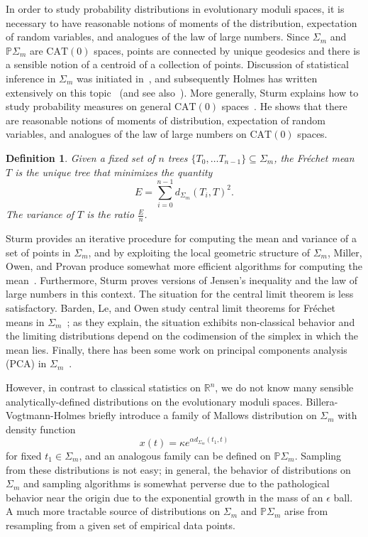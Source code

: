 \documentclass[a4paper,11pt]{article}
\newtheorem{definition}[theorem]{Definition}
\newcommand{\CAT}{\textrm{CAT}}
\begin{document}
In order to study probability distributions in evolutionary moduli spaces, it is necessary to have reasonable notions of moments of the distribution, expectation of random variables, and analogues of the law of large numbers.
Since $\Sigma_m$ and $\mathbb{P}\Sigma_m$ are $\CAT(0)$ spaces, points are connected by unique geodesics and there is a sensible notion of a centroid of a collection of points.
Discussion of statistical inference in $\Sigma_m$ was initiated in~\cite{billera2001geometry}, and subsequently Holmes has written extensively on this topic~\cite{holmes2003bootstrapping, holmes2003bootstrapping, holmes2005statistical} (and see also~\cite{feragen2013tree}).
More generally, Sturm explains how to study probability measures on general $\CAT(0)$ spaces~\cite{sturm2003probability}.
He shows that there are reasonable notions of moments of distribution, expectation of random variables, and analogues of the law of large numbers on $\CAT(0)$ spaces.

\begin{definition}
Given a fixed set of $n$ trees $\{T_0, \ldots T_{n-1}\} \subseteq \Sigma_m$, the Fr\'echet mean $T$ is the unique tree that minimizes the quantity \[E = \sum_{i = 0}^{n-1} d_{\Sigma_m}(T_i, T)^2.\] 
The variance of $T$ is the ratio $\frac{E}{n}$.
\end{definition}

Sturm provides an iterative procedure for computing the mean and variance of a set of points in $\Sigma_m$, and by exploiting the local geometric structure of $\Sigma_m$, Miller, Owen, and Provan produce somewhat more efficient algorithms for computing the mean~\cite{miller2012polyhedral}.
Furthermore, Sturm proves versions of Jensen's inequality and the law of large numbers in this context.
The situation for the central limit theorem is less satisfactory.
Barden, Le, and Owen study central limit theorems for Fr\'echet means in $\Sigma_m$~\cite{barden2013mean}; as they explain, the situation exhibits non-classical behavior and the limiting distributions depend on the codimension of the simplex in which the mean lies.
Finally, there has been some work on principal components analysis (PCA) in $\Sigma_m$~\cite{Nye2011PCA}.

However, in contrast to classical statistics on $\mathbb{R}^n$, we do not know many sensible analytically-defined distributions on the evolutionary moduli spaces.
Billera-Vogtmann-Holmes briefly introduce a family of Mallows distribution on $\Sigma_m$ with density function
\[
x(t) = \kappa e^{\alpha d_{\Sigma_m}(t_1, t)}
\] 
for fixed $t_1 \in \Sigma_m$, and an analogous family can be defined on $\mathbb{P}\Sigma_m$.
Sampling from these distributions is not easy; in general, the behavior of distributions on $\Sigma_m$ and sampling algorithms is somewhat perverse due to the pathological behavior near the origin due to the exponential growth in the mass of an $\epsilon$ ball.
A much more tractable source of distributions on $\Sigma_m$ and $\mathbb{P}\Sigma_m$ arise from resampling from a given set of empirical data points.
\end{document}
